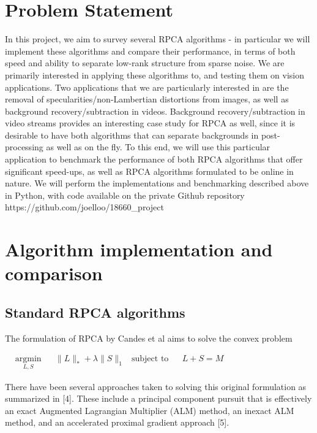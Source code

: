 \documentclass[oneside]{article}
\begin{document}
\section{Problem Statement}
In this project, we aim to survey several RPCA algorithms - in particular we will implement these algorithms and compare their performance, in terms of both speed and ability to separate low-rank structure from sparse noise. We are primarily interested in applying these algorithms to, and testing them on vision applications. Two applications that we are particularly interested in are the removal of specularities/non-Lambertian distortions from images, as well as background recovery/subtraction in videos. Background recovery/subtraction in video streams provides an interesting case study for RPCA as well, since it is desirable to have both algorithms that can separate backgrounds in post-processing as well as on the fly. To this end, we will use this particular application to benchmark the performance of both RPCA algorithms that offer significant speed-ups, as well as RPCA algorithms formulated to be online in nature. We will perform the implementations and benchmarking described above in Python, with code available on the private Github repository https://github.com/joelloo/18660\_project
\section{Algorithm implementation and comparison}
\subsection{Standard RPCA algorithms}
The formulation of RPCA by Candes et al aims to solve the convex problem
\begin{center}
$
\begin{aligned}
& \underset{L,S}{\text{argmin}}
& & \lVert L\rVert_{*}+ \lambda\lVert S\rVert_{1} 
& \text{subject to}
& & L+S=M
\end{aligned}
$
\end{center}
There have been several approaches taken to solving this original formulation as summarized in [4]. These include a principal component pursuit that is effectively an exact Augmented Lagrangian Multiplier (ALM) method, an inexact ALM method, and an accelerated proximal gradient approach [5].
\end{document}
